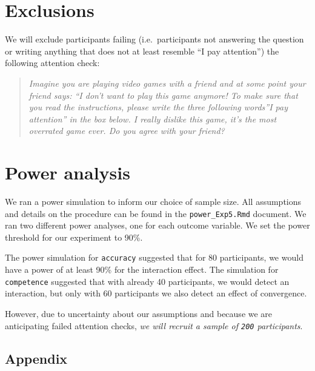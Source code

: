 \documentclass[
]{article}
\begin{document}
\hypertarget{exclusions}{%
\section{Exclusions}\label{exclusions}}

We will exclude participants failing (i.e.~participants not answering
the question or writing anything that does not at least resemble ``I pay
attention'') the following attention check:

\begin{quote}
\emph{Imagine you are playing video games with a friend and at some
point your friend says: ``I don't want to play this game anymore! To
make sure that you read the instructions, please write the three
following words''I pay attention'' in the box below. I really dislike
this game, it's the most overrated game ever. Do you agree with your
friend?}
\end{quote}

\hypertarget{power-analysis}{%
\section{Power analysis}\label{power-analysis}}

We ran a power simulation to inform our choice of sample size. All
assumptions and details on the procedure can be found in the
\texttt{power\_Exp5.Rmd} document. We ran two different power analyses,
one for each outcome variable. We set the power threshold for our
experiment to 90\%.

The power simulation for \texttt{accuracy} suggested that for 80
participants, we would have a power of at least 90\% for the interaction
effect. The simulation for \texttt{competence} suggested that with
already 40 participants, we would detect an interaction, but only with
60 participants we also detect an effect of convergence.

However, due to uncertainty about our assumptions and because we are
anticipating failed attention checks, \emph{we will recruit a sample of
\texttt{200} participants}.

\hypertarget{appendix}{%
\subsection{Appendix}\label{appendix}}
\end{document}
